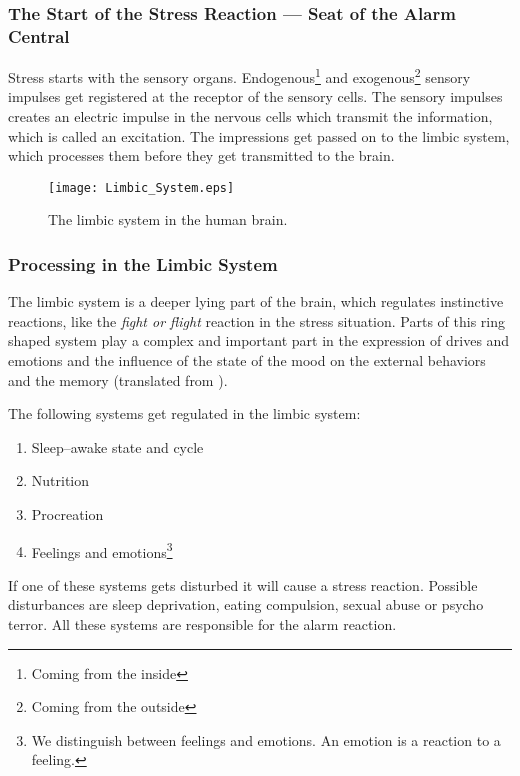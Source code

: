 \documentclass[../Book.Stress_regulation.tex]{subfiles}
\begin{document}
\subsubsection{The Start of the Stress Reaction  ---  Seat of the Alarm Central}
Stress starts with the {sensory organs}. Endogenous\footnote{Coming from the inside} and exogenous\footnote{Coming from the outside} {sensory impulses} get registered at the receptor of the {sensory cells}.
 The sensory impulses creates an {electric impulse} in the nervous cells which transmit the information, which is called an {excitation}.
 The impressions get passed on to the {limbic system}, which {processes them} before they get transmitted to the brain.


\begin{figure}[htb]
\texttt{[image: Limbic\_System.eps]}
\caption{The limbic system in the human brain.}
\end{figure}



\subsubsection{Processing in the Limbic System}

The limbic system is a {deeper lying part} of the brain, which regulates {instinctive
  reactions}, like the \emph{fight or flight} reaction in the stress situation.
Parts of this ring shaped system play a complex and important part in the {expression of drives and emotions} and the influence of the state of the mood on the external behaviors and the memory (translated from \cite{DorlingAtlas}).

The following systems get regulated in the limbic system:
\begin{enumerate}
\item {Sleep--awake state and cycle}
\item {Nutrition}
\item {Procreation}
\item {Feelings and emotions}\footnote{We distinguish between feelings and emotions. An {emotion is a reaction} to a feeling.}
\end{enumerate}




If one of these systems gets disturbed it will {cause a stress reaction}. Possible disturbances are sleep deprivation, eating compulsion, sexual abuse or psycho terror.
All these systems are responsible for the {alarm reaction}.
\end{document}
